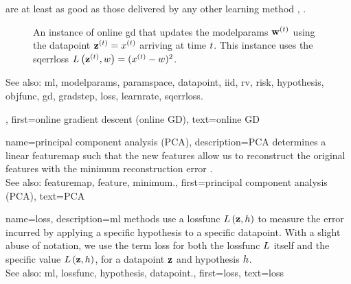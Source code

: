 {{		are at least as good as those delivered by any other learning method \cite{HazanOCO}, \cite{GDOptimalRakhlin2012}. 
\begin{figure}[H]
	\begin{center}
\end{center} 
\caption{An instance of online \gls{gd} that updates the \gls{modelparams} ${\bf w}^{(t)}$ 
using the \gls{datapoint} ${\bf z}^{(t)} = x^{(t)}$ arriving at time $t$. 
This instance uses the \gls{sqerrloss} $L\left({\bf z}^{(t)},w \right) = (x^{(t)} - w)^{2}$.}
\end{figure}
		See also: \gls{ml}, \gls{modelparams}, \gls{paramspace}, \gls{datapoint}, \gls{iid}, \gls{rv}, \gls{risk}, \gls{hypothesis}, \gls{objfunc}, \gls{gd}, \gls{gradstep}, \gls{loss}, \gls{learnrate}, \gls{sqerrloss}.},
	first={online gradient descent (online GD)},
	text={online GD}
}

{name={principal component analysis (PCA)}, 
	description={PCA 
		determines a linear \gls{featuremap} such that the new \glspl{feature} 
		allow us to reconstruct the original \glspl{feature} with the \gls{minimum} reconstruction error \cite{MLBasics}.
				\\
		See also: \gls{featuremap}, \gls{feature}, \gls{minimum}.},
	first={principal component analysis (PCA)},
	text={PCA} 
}
	
{name={loss}, 
	description={\gls{ml} methods use a 
		\gls{lossfunc} $L\left({\bf z},h \right)$ to measure the error incurred 
		by applying a specific \gls{hypothesis} to a specific \gls{datapoint}. With a
		slight abuse of notation, we use the term loss for both the \gls{lossfunc} $L$ 
		itself and the specific value $L\left({\bf z},h \right)$, for a \gls{datapoint} ${\bf z}$ 
		and \gls{hypothesis} $h$.
				\\
		See also: \gls{ml}, \gls{lossfunc}, \gls{hypothesis}, \gls{datapoint}.},
	first={loss},
	text={loss} 
}

